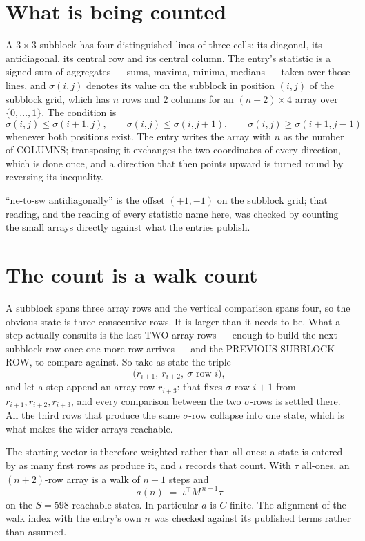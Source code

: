 \documentclass[11pt,a4paper]{article}
\theoremstyle{plain}
\theoremstyle{definition}
\begin{document}
\section{What is being counted}

A $3\times3$ subblock has four distinguished lines of three cells: its diagonal, its
antidiagonal, its central row and its central column. The entry's statistic is a signed sum of
aggregates --- sums, maxima, minima, medians --- taken over those lines, and $\sigma(i,j)$
denotes its value on the subblock in position $(i,j)$ of the subblock grid, which has $n$ rows
and $2$ columns for an $(n+2)\times4$ array over $\{0,\dots,1\}$. The condition is
\[
\sigma(i,j)\le\sigma(i+1,j),\qquad \sigma(i,j)\le\sigma(i,j+1),\qquad \sigma(i,j)\ge\sigma(i+1,j-1)
\]
whenever both positions exist. The entry writes the array with $n$ as the number of COLUMNS; transposing it exchanges the two coordinates of every direction, which is done once, and a direction that then points upward is turned round by reversing its inequality.

``ne-to-sw antidiagonally'' is the offset $(+1,-1)$ on the subblock grid; that reading, and
the reading of every statistic name here, was checked by counting the small arrays directly
against what the entries publish.

\section{The count is a walk count}

A subblock spans three array rows and the vertical comparison spans four, so the obvious state
is three consecutive rows. It is larger than it needs to be. What a step actually consults is
the last TWO array rows --- enough to build the next subblock row once one more row arrives ---
and the PREVIOUS SUBBLOCK ROW, to compare against. So take as state the triple
\[
\bigl(r_{i+1},\ r_{i+2},\ \sigma\text{-row }i\bigr),
\]
and let a step append an array row $r_{i+3}$: that fixes $\sigma$-row $i+1$ from
$r_{i+1},r_{i+2},r_{i+3}$, and every comparison between the two $\sigma$-rows is settled
there. All the third rows that produce the same $\sigma$-row collapse into one state, which is
what makes the wider arrays reachable.

The starting vector is therefore weighted rather than all-ones: a state is entered by as many
first rows as produce it, and $\iota$ records that count. With $\tau$ all-ones, an
$(n+2)$-row array is a walk of $n-1$ steps and
\[
a(n)\;=\;\iota^{\!\top}M^{\,n-1}\tau
\]
on the $S=598$ reachable states. In particular $a$ is $C$-finite. The alignment of the walk
index with the entry's own $n$ was checked against its published terms rather than assumed.
\end{document}
